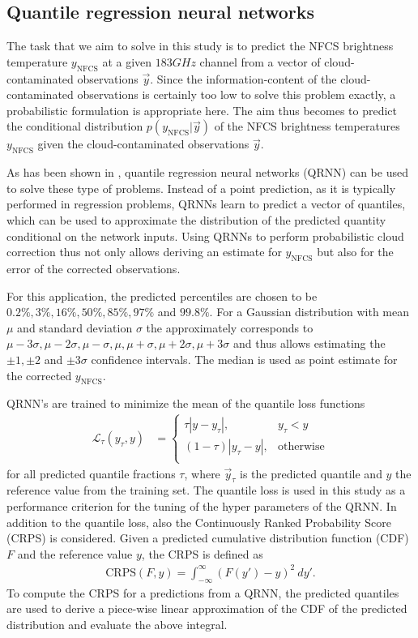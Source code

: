 \documentclass[amt, manuscript]{copernicus}
\newcommand{\ynfcs}{y_\text{NFCS}}
\newcommand{\y}{\vec{y}}
\begin{document}
\subsection{Quantile regression neural networks}
\label{sec:QRNN}
%
The task that we aim to solve in this study is to predict the NFCS brightness
temperature $\ynfcs$ at a given $183\unit{GHz}$ channel from a vector of
cloud-contaminated observations $\y$. Since the information-content of the
cloud-contaminated observations is certainly too low to solve this problem
exactly, a probabilistic formulation is appropriate here. The aim thus becomes
to predict the conditional distribution $p(\ynfcs | \y)$ of the NFCS brightness
temperatures $\ynfcs$ given the cloud-contaminated observations $\y$.

As has been shown in \citet{pfreundschuh:aneur:18}, quantile regression neural
networks (QRNN) can be used to solve these type of problems. Instead of a point
prediction, as it is typically performed in regression problems, QRNNs learn to
predict a vector of quantiles, which can be used to approximate the distribution
of the predicted quantity conditional on the network inputs. Using QRNNs to
perform probabilistic cloud correction thus not only allows deriving an estimate
for $\ynfcs$ but also for the error of the corrected observations.

For this application, the predicted percentiles are chosen to be
$0.2\%, 3\%, 16\%, 50\%, 85\%, 97\%$ and $99.8\%$. For a Gaussian
distribution with mean $\mu$ and standard deviation $\sigma$ the
approximately corresponds to $\mu -3\sigma, \mu-2\sigma, \mu-\sigma
, \mu, \mu + \sigma, \mu + 2\sigma, \mu + 3\sigma$ and thus allows
estimating the $\pm 1, \pm 2$ and $\pm 3\sigma$ confidence intervals.
The median is used as point estimate for the corrected $\ynfcs$.

QRNN's are trained to minimize the mean of the quantile loss functions
%
\begin{align}
  \mathcal{L}_\tau(y_\tau, y) &=
  \begin{cases}
    \tau|y - y_\tau|, & y_\tau < y \\ (1 - \tau)|y_\tau - y|, & \text{otherwise}
    \\
  \end{cases}
\end{align}
%
for all predicted quantile fractions $\tau$, where $\y_\tau$ is the predicted
quantile and $y$ the reference value from the training set. The quantile loss is
used in this study as a performance criterion for the tuning of the hyper
parameters of the QRNN. In addition to the quantile loss, also the Continuously
Ranked Probability Score (CRPS) is considered. Given a predicted cumulative
distribution function (CDF) $F$ and the reference value $y$, the CRPS is defined as
%
\begin{align}
  \text{CRPS}(F, y) = \int_{-\infty}^{\infty} \left (F(y') - y\right )^2\: dy'.
\end{align}
%
To compute the CRPS for a predictions from a QRNN, the predicted quantiles are
used to derive a piece-wise linear approximation of the CDF of the predicted
distribution and evaluate the above integral.
\end{document}
